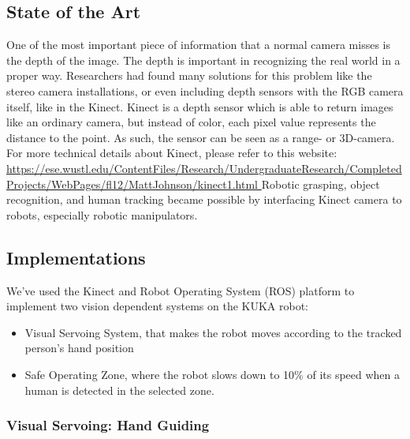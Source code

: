 \subsection{State of the Art}

One of the most important piece of information that a normal camera misses is the depth of the image. The depth is important in recognizing the real world in a proper way. Researchers had found many solutions for this problem like the stereo camera installations, or even including depth sensors with the RGB camera itself, like in the Kinect.
Kinect is a depth sensor which is able to return images like an ordinary camera, but instead of color, each pixel value represents the distance to the point. As such, the sensor can be seen as a range- or 3D-camera. For more technical details about Kinect, please refer to this website:
\newline \url{ https://ese.wustl.edu/ContentFiles/Research/UndergraduateResearch/CompletedProjects/WebPages/fl12/MattJohnson/kinect1.html }
Robotic grasping, object recognition, and human tracking became possible by interfacing Kinect camera to robots, especially robotic manipulators.

\subsection{Implementations}
We’ve used the Kinect and Robot Operating System (ROS) platform to implement two vision dependent systems on the KUKA robot:\begin{itemize}
	\item Visual Servoing System, that makes the robot moves according to the tracked person’s hand position
	\item Safe Operating Zone, where the robot slows down to 10\% of its speed when a human is detected in the selected zone.
\end{itemize}



\subsubsection{Visual Servoing: Hand Guiding}
